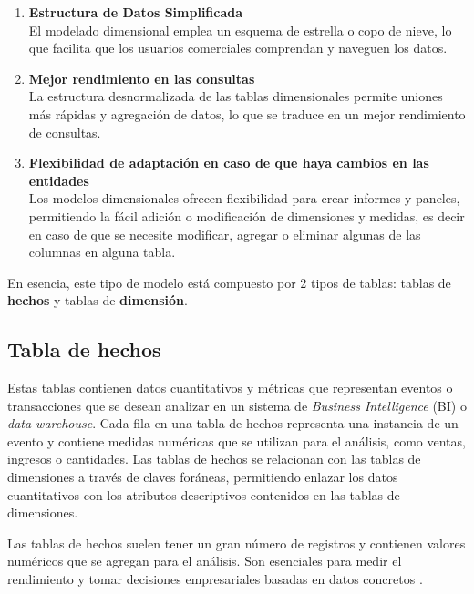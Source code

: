 \begin{enumerate}
    \item \textbf{Estructura de Datos Simplificada}\\
    El modelado dimensional emplea un esquema de estrella o copo de nieve, lo que facilita que los usuarios comerciales comprendan y naveguen los datos.

    \item \textbf{Mejor rendimiento en las consultas}\\
    La estructura desnormalizada de las tablas dimensionales permite uniones más rápidas y agregación de datos, lo que se traduce en un mejor rendimiento de consultas.

    \item  \textbf{Flexibilidad de adaptación en caso de que haya cambios en las entidades}\\
    Los modelos dimensionales ofrecen flexibilidad para crear informes y paneles, permitiendo la fácil adición o modificación de dimensiones y medidas, es decir en caso de que se necesite modificar, agregar o eliminar algunas de las columnas en alguna tabla.
    
\end{enumerate}

En esencia, este tipo de modelo está compuesto por 2 tipos de tablas: tablas de \textbf{hechos} y tablas de \textbf{dimensión}.

\subsection{Tabla de hechos}

Estas tablas contienen datos cuantitativos y métricas que representan eventos o transacciones que se desean analizar en un sistema de \textit{Business Intelligence} (BI) o \textit{data warehouse}. Cada fila en una tabla de hechos representa una instancia de un evento y contiene medidas numéricas que se utilizan para el análisis, como ventas, ingresos o cantidades. Las tablas de hechos se relacionan con las tablas de dimensiones a través de claves foráneas, permitiendo enlazar los datos cuantitativos con los atributos descriptivos contenidos en las tablas de dimensiones.

Las tablas de hechos suelen tener un gran número de registros y contienen valores numéricos que se agregan para el análisis. Son esenciales para medir el rendimiento y tomar decisiones empresariales basadas en datos concretos \cite{schneider2012analysis} \cite{kimball2002data}.

